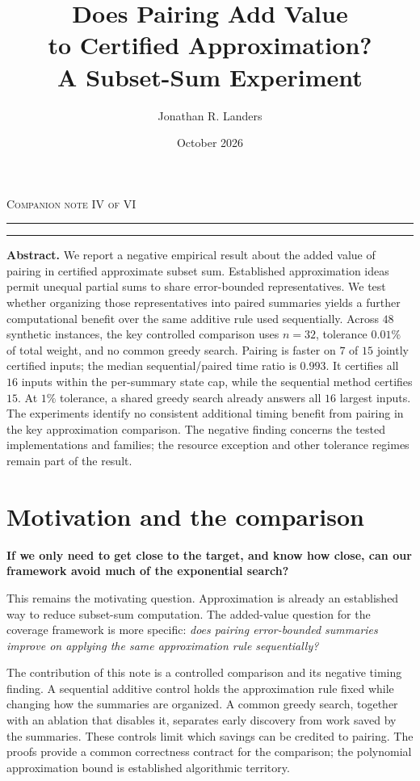 \documentclass[10pt,english]{article}
\title{\sffamily\bfseries Does Pairing Add Value\\ to Certified Approximation?\\ A Subset-Sum Experiment}
\author{Jonathan R. Landers}
\date{October 2026}
\begin{document}
\maketitle
\vspace{-1em}
\noindent\textcolor{paperaccent}{\footnotesize\textsc{Companion note IV of VI}}
\par\noindent\textcolor{paperaccent}{\rule{.11\linewidth}{1.5pt}}\textcolor{paperline}{\rule{.89\linewidth}{.45pt}}
\vspace{.65em}

\begin{tcolorbox}[accentbox]
\textbf{Abstract.} We report a negative empirical result about the added value of pairing in certified approximate subset sum. Established approximation ideas permit unequal partial sums to share error-bounded representatives. We test whether organizing those representatives into paired summaries yields a further computational benefit over the same additive rule used sequentially. Across \(48\) synthetic instances, the key controlled comparison uses \(n=32\), tolerance \(0.01\%\) of total weight, and no common greedy search. Pairing is faster on \(7\) of \(15\) jointly certified inputs; the median sequential/paired time ratio is \(0.993\). It certifies all \(16\) inputs within the per-summary state cap, while the sequential method certifies \(15\). At \(1\%\) tolerance, a shared greedy search already answers all \(16\) largest inputs. The experiments identify no consistent additional timing benefit from pairing in the key approximation comparison. The negative finding concerns the tested implementations and families; the resource exception and other tolerance regimes remain part of the result.
\end{tcolorbox}

\section{Motivation and the comparison}
\textbf{If we only need to get close to the target, and know how close, can our framework avoid much of the exponential search?}

This remains the motivating question. Approximation is already an established way to reduce subset-sum computation. The added-value question for the coverage framework is more specific: \emph{does pairing error-bounded summaries improve on applying the same approximation rule sequentially?}

The contribution of this note is a controlled comparison and its negative timing finding. A sequential additive control holds the approximation rule fixed while changing how the summaries are organized. A common greedy search, together with an ablation that disables it, separates early discovery from work saved by the summaries. These controls limit which savings can be credited to pairing. The proofs provide a common correctness contract for the comparison; the polynomial approximation bound is established algorithmic territory.
\end{document}
